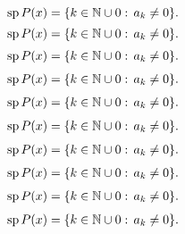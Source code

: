 \documentclass{amsart}
\numberwithin{equation}{section}
\begin{document}
{
\begin{equation*} 
{{\rm sp\,}} P(x)=\{k\in {\ensuremath{\mathbb N}}\cup {0}:\, a_k\neq 0\}.
 \end{equation*}\fi  
{}\begin{equation}
{{\rm sp\,}} P(x)=\{k\in {\ensuremath{\mathbb N}}\cup {0}:\, a_k\neq 0\}.
\end{equation}\fi   
{}\begin{align*}
{{\rm sp\,}} P(x)=\{k\in {\ensuremath{\mathbb N}}\cup {0}:\, a_k\neq 0\}.
\end{align*}\fi   
{}\begin{align}
{{\rm sp\,}} P(x)=\{k\in {\ensuremath{\mathbb N}}\cup {0}:\, a_k\neq 0\}.
\end{align}\fi    
{}\begin{gather*}
{{\rm sp\,}} P(x)=\{k\in {\ensuremath{\mathbb N}}\cup {0}:\, a_k\neq 0\}.
\end{gather*}\fi  
{}\begin{gather}
{{\rm sp\,}} P(x)=\{k\in {\ensuremath{\mathbb N}}\cup {0}:\, a_k\neq 0\}.
\end{gather}\fi   
{}\begin{multline*}
{{\rm sp\,}} P(x)=\{k\in {\ensuremath{\mathbb N}}\cup {0}:\, a_k\neq 0\}.
\end{multline*}\fi  
{}\begin{multline}
{{\rm sp\,}} P(x)=\{k\in {\ensuremath{\mathbb N}}\cup {0}:\, a_k\neq 0\}.
\end{multline}\fi  
{}\begin{multline*}\begin{split}
{{\rm sp\,}} P(x)=\{k\in {\ensuremath{\mathbb N}}\cup {0}:\, a_k\neq 0\}.
\end{split}\end{multline*}\fi
{}\begin{multline}\begin{split}
{{\rm sp\,}} P(x)=\{k\in {\ensuremath{\mathbb N}}\cup {0}:\, a_k\neq 0\}.
\end{split}\end{multline}\fi
}
\end{document}
